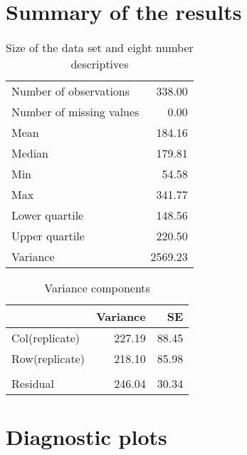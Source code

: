 \documentclass[a4paper,11pt]{article}\usepackage[]{graphicx}\usepackage[]{color}
\begin{document}
\newpage
\section{Summary of the results}

\begin{table}[ht]
\begin{flushleft}
\caption{Size of the data set and eight number descriptives} 
\label{modelSummary}
\begin{tabular}{lr}
  \hline
  \hline
Number of observations & 338.00 \\ 
  Number of missing values & 0.00 \\ 
  Mean & 184.16 \\ 
  Median & 179.81 \\ 
  Min & 54.58 \\ 
  Max & 341.77 \\ 
  Lower quartile & 148.56 \\ 
  Upper quartile & 220.50 \\ 
  Variance & 2569.23 \\ 
   \hline
\end{tabular}
\end{flushleft}
\end{table}


\begin{table}[ht]
\begin{flushleft}
\caption{Variance components} 
\label{varComps}
\begin{tabular}{lrr}
  \hline
 & Variance & SE \\ 
  \hline
Col(replicate) & 227.19 & 88.45 \\ 
  Row(replicate) & 218.10 & 85.98 \\ 
   &  &  \\ 
  Residual & 246.04 & 30.34 \\ 
   \hline
\end{tabular}
\end{flushleft}
\end{table}

\clearpage

\section{Diagnostic plots}
\end{document}
